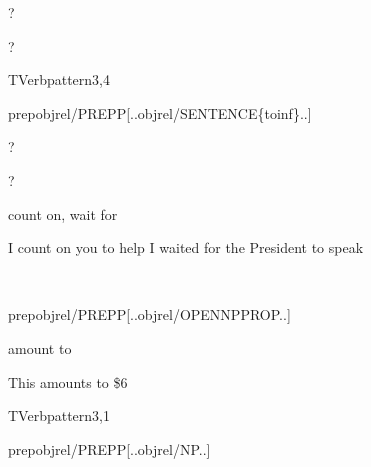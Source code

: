 
\begin{thetadescr}
\evitem ?
\esitem
     \begin{examples}
        \example ?
     \end{examples}
\end{thetadescr}


\newpage
\verbpattern{[synPREPCLOSEDTOSENT]}
\begin{vpattern}
 TVerbpattern3,4
\csritem \mbox{}\\
     \begin{csr}
     prepobjrel/PREPP[..objrel/SENTENCE\{toinf\}..]
     \end{csr}
\remarksitem
\end{vpattern}


\begin{thetadescr}
\evitem ?
\esitem
     \begin{examples}
        \example ?
     \end{examples}
\end{thetadescr}



\begin{thetadescr}
\evitem count on, wait for
\esitem
     \begin{examples}
        \example I count on you to help
        \example I waited for the President to speak
     \end{examples}
\end{thetadescr}


\newpage
\verbpattern{[synPREPMEASUREPHRASE]}
\begin{vpattern}
 \norule
\csritem \mbox{}\\
     \begin{csr}
     prepobjrel/PREPP[..objrel/OPENNPPROP..]
     \end{csr}
\remarksitem
\end{vpattern}



\begin{thetadescr}
\evitem amount to
\esitem
     \begin{examples}
        \example This amounts to \$6
     \end{examples}
\end{thetadescr}


\newpage
\verbpattern{[synPREPNP]}
\begin{vpattern}
 TVerbpattern3,1   
\csritem \mbox{}\\
     \begin{csr}
      prepobjrel/PREPP[..objrel/NP..]
     \end{csr}
\remarksitem
\end{vpattern}

